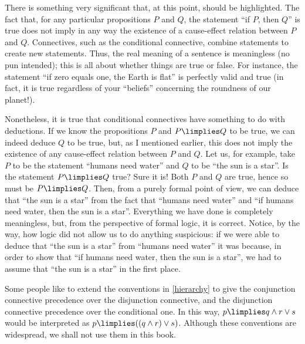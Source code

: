 \begin{remark}
There is something very significant that, at this point, should be highlighted.
The fact that, for any particular propositions $P$ and $Q$, the statement ``if $P$, then $Q$'' is true does not imply in any way the existence of a cause-effect relation between $P$ and $Q$.
Connectives, such as the conditional connective, combine statements to create new statements.
Thus, the real meaning of a sentence is meaningless (no pun intended); this is all about whether things are true or false.
For instance, the statement ``if zero equals one, the Earth is flat'' is perfectly valid and true (in fact, it is true regardless of your ``beliefs'' concerning the roundness of our planet!).

Nonetheless, it is true that conditional connectives have something to do with deductions.
If we know the propositions $P$ and $P\limplies Q$ to be true, we can indeed deduce $Q$ to be true, but, as I mentioned earlier, this does not imply the existence of any cause-effect relation between $P$ and $Q$.
Let us, for example, take $P$ to be the statement ``humans need water'' and $Q$ to be ``the sun is a star''.
Is the statement $P\limplies Q$ true? Sure it is!
Both $P$ and $Q$ are true, hence so must be $P\limplies Q$.
Then, from a purely formal point of view, we can deduce that ``the sun is a star'' from the fact that ``humans need water'' and ``if humans need water, then the sun is a star''.
Everything we have done is completely meaningless, but, from the perspective of formal logic, it is correct.
Notice, by the way, how logic did not allow us to do anything suspicious: if we were able to deduce that ``the sun is a star'' from ``humans need water'' it was because, in order to show that ``if humans need water, then the sun is a star'', we had to assume that ``the sun is a star'' in the first place.

\end{remark}

\begin{para}
Some people like to extend the conventions in \ref{hierarchy} to give the conjunction connective precedence over the disjunction connective, and the disjunction connective precedence over the conditional one.
In this way, $p\limplies q \land r \lor s$ would be interpreted as $p\limplies ((q \land r) \lor s)$.
Although these conventions are widespread, we shall not use them in this book.
\end{para}

